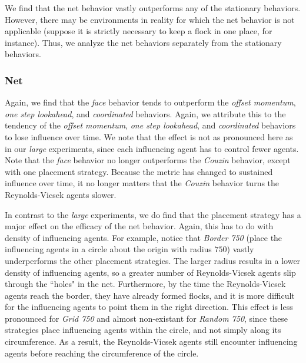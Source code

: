 We find that the net behavior vastly outperforms any of the stationary
behaviors.
However, there may be environments in reality for which the net behavior is not
applicable (suppose it is strictly necessary to keep a flock in one place, for
instance).
Thus, we analyze the net behaviors separately from the stationary behaviors.

\subsubsection{Net}
Again, we find that the \textit{face} behavior tends to outperform the
\textit{offset momentum}, \textit{one step lookahead}, and \textit{coordinated}
behaviors.
Again, we attribute this to the tendency of the \textit{offset momentum},
\textit{one step lookahead}, and \textit{coordinated} behaviors to lose
influence over time.
We note that the effect is not as pronounced here as in our \textit{large}
experiments, since each influencing agent has to control fewer agents.
Note that the \textit{face} behavior no longer outperforms the \textit{Couzin}
behavior, except with one placement strategy.
Because the metric has changed to sustained influence over time, it no longer
matters that the \textit{Couzin} behavior turns the Reynolds-Vicsek agents
slower.

In contrast to the \textit{large} experiments, we do find that the placement
strategy has a major effect on the efficacy of the net behavior.
Again, this has to do with density of influencing agents.
For example, notice that \textit{Border 750} (place the influencing agents in a
circle about the origin with radius $750$) vastly underperforms the other
placement strategies.
The larger radius results in a lower density of influencing agents, so a greater
number of Reynolds-Vicsek agents slip through the ``holes" in the net.
Furthermore, by the time the Reynolds-Vicsek agents reach the border, they have
already formed flocks, and it is more difficult for the influencing agents to
point them in the right direction.
This effect is less pronounced for \textit{Grid 750} and almost non-existant
for \textit{Random 750}, since these strategies place influencing agents within
the circle, and not simply along its circumference.
As a result, the Reynolds-Vicsek agents still encounter influencing agents
before reaching the circumference of the circle.

